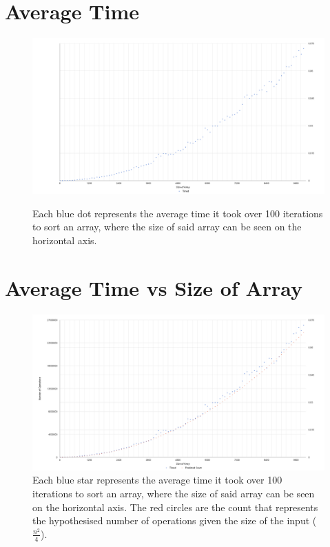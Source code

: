 \documentclass[12pt]{article}
\begin{document}
\begin{appendices}
\newpage

\section{Average Time}
\begin{figure}[h]
	\centering
	\includegraphics[scale=0.15]{average-time}\\[.1cm]
	\caption{\label{average-time}Each blue dot represents the average time it took over 100 iterations to sort an array, where the size of said array can be seen on the horizontal axis.}
\end{figure}

\newpage

\section{Average Time vs Size of Array}
\begin{figure}[h]
	\centering
	\includegraphics[scale=0.15]{average-time-vs-size-of-array}
	\caption{\label{average-time-vs-size-of-array}  Each blue star represents the average time it took over 100 iterations to sort an array, where the size of said array can be seen on the horizontal axis. The red circles are the count that represents the hypothesised number of operations given the size of the input ($\frac{n^2}{4}$).}
\end{figure}


\end{appendices}
\end{document}
